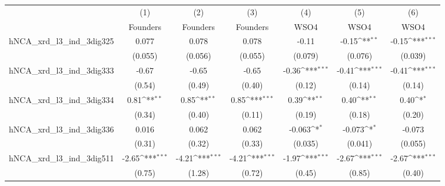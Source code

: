 {
\def\sym#1{\ifmmode^{#1}\else\(^{#1}\)\fi}
\begin{tabular}{l*{6}{c}}
\toprule
                    &\multicolumn{1}{c}{(1)}&\multicolumn{1}{c}{(2)}&\multicolumn{1}{c}{(3)}&\multicolumn{1}{c}{(4)}&\multicolumn{1}{c}{(5)}&\multicolumn{1}{c}{(6)}\\
                    &\multicolumn{1}{c}{Founders}&\multicolumn{1}{c}{Founders}&\multicolumn{1}{c}{Founders}&\multicolumn{1}{c}{WSO4}&\multicolumn{1}{c}{WSO4}&\multicolumn{1}{c}{WSO4}\\
\midrule
hNCA\_xrd\_l3\_ind\_3dig325&       0.077         &       0.078         &       0.078         &       -0.11         &       -0.15\sym{**} &       -0.15\sym{***}\\
                    &     (0.055)         &     (0.056)         &     (0.055)         &     (0.079)         &     (0.076)         &     (0.039)         \\
\addlinespace
hNCA\_xrd\_l3\_ind\_3dig333&       -0.67         &       -0.65         &       -0.65         &       -0.36\sym{***}&       -0.41\sym{***}&       -0.41\sym{***}\\
                    &      (0.54)         &      (0.49)         &      (0.40)         &      (0.12)         &      (0.14)         &      (0.14)         \\
\addlinespace
hNCA\_xrd\_l3\_ind\_3dig334&        0.81\sym{**} &        0.85\sym{**} &        0.85\sym{***}&        0.39\sym{**} &        0.40\sym{**} &        0.40\sym{*}  \\
                    &      (0.34)         &      (0.40)         &      (0.11)         &      (0.19)         &      (0.18)         &      (0.20)         \\
\addlinespace
hNCA\_xrd\_l3\_ind\_3dig336&       0.016         &       0.062         &       0.062         &      -0.063\sym{*}  &      -0.073\sym{*}  &      -0.073         \\
                    &      (0.31)         &      (0.32)         &      (0.33)         &     (0.035)         &     (0.041)         &     (0.055)         \\
\addlinespace
hNCA\_xrd\_l3\_ind\_3dig511&       -2.65\sym{***}&       -4.21\sym{***}&       -4.21\sym{***}&       -1.97\sym{***}&       -2.67\sym{***}&       -2.67\sym{***}\\
                    &      (0.75)         &      (1.28)         &      (0.72)         &      (0.45)         &      (0.85)         &      (0.40)         \\

\end{tabular}}
